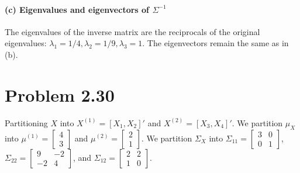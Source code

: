 \documentclass[12pt]{article}
\begin{document}
\paragraph{(c) Eigenvalues and eigenvectors of $\Sigma^{-1}$} 
The eigenvalues of the inverse matrix are the reciprocals of the original eigenvalues: $\lambda_1=1/4, \lambda_2=1/9, \lambda_3=1$. The eigenvectors remain the same as in (b). 

\section*{Problem 2.30} 
Partitioning $X$ into $X^{(1)} = [X_1, X_2]'$ and $X^{(2)} = [X_3, X_4]'$. 
We partition $\mu_X$ into $\mu^{(1)} = \begin{bmatrix} 4 \\ 3 \end{bmatrix}$ and $\mu^{(2)} = \begin{bmatrix} 2 \\ 1 \end{bmatrix}$. 
We partition $\Sigma_X$ into $\Sigma_{11} = \begin{bmatrix} 3 & 0 \\ 0 & 1 \end{bmatrix}$, $\Sigma_{22} = \begin{bmatrix} 9 & -2 \\ -2 & 4 \end{bmatrix}$, and $\Sigma_{12} = \begin{bmatrix} 2 & 2 \\ 1 & 0 \end{bmatrix}$. 
\end{document}
